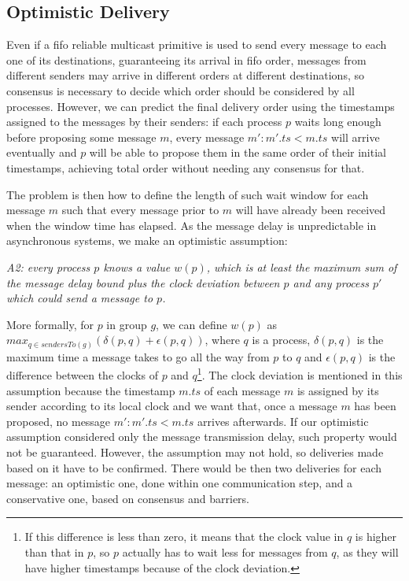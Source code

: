 \documentclass[times, 10pt]{article}
\begin{document}
\subsection{Optimistic Delivery}
\label{sec:optdel}

Even if a fifo reliable multicast primitive is used to send every message to each one of its destinations, guaranteeing its arrival in fifo order, messages from different senders may arrive in different orders at different destinations, so consensus is necessary to decide which order should be considered by all processes. However, we can predict the final delivery order using the timestamps assigned to the messages by their senders: if each process $p$ waits long enough before proposing some message $m$, every message $m' : m'.ts < m.ts$ will arrive eventually and $p$ will be able to propose them in the same order of their initial timestamps, achieving total order without needing any consensus for that.

The problem is then how to define the length of such wait window for each message $m$ such that every message prior to $m$ will have already been received when the window time has elapsed. As the message delay is unpredictable in asynchronous systems, we make an optimistic assumption:

\begin{center}
\emph{A2: every process $p$ knows a value $w(p)$, which is at least the maximum sum of the message delay bound plus the clock deviation between $p$ and any process $p'$ which could send a message to $p$.}
\end{center}

More formally, for $p$ in group $g$, we can define $w(p)$ as $max_{q \in sendersTo(g)}(\delta(p,q)+\epsilon(p,q))$, where $q$ is a process, $\delta(p,q)$ is the maximum time a message takes to go all the way from $p$ to $q$ and $\epsilon(p,q)$ is the difference between the clocks of $p$ and $q$\footnote{If this difference is less than zero, it means that the clock value in $q$ is higher than that in $p$, so $p$ actually has to wait less for messages from $q$, as they will have higher timestamps because of the clock deviation.}. The clock deviation is mentioned in this assumption because the timestamp $m.ts$ of each message $m$ is assigned by its sender according to its local clock and we want that, once a message $m$ has been proposed, no message $m' : m'.ts < m.ts$ arrives afterwards. If our optimistic assumption considered only the message transmission delay, such property would not be guaranteed. However, the assumption may not hold, so deliveries made based on it have to be confirmed. There would be then two deliveries for each message: an optimistic one, done within one communication step, and a conservative one, based on consensus and barriers. 
\end{document}
